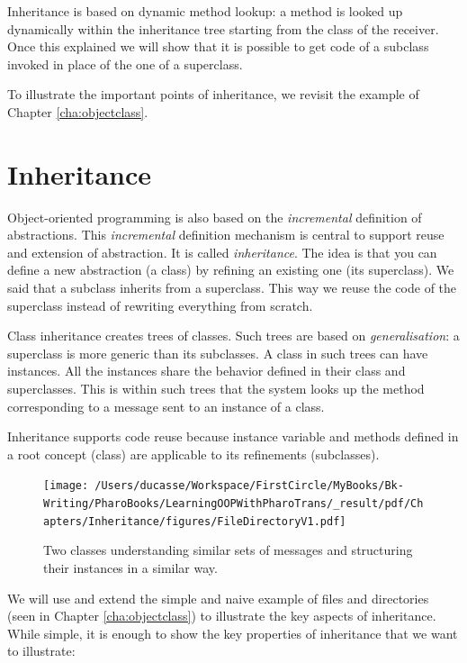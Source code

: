 \documentclass[10pt,twoside,english]{_support/latex/sbabook/sbabook}
\begin{document}
Inheritance is based on dynamic method lookup: a method is looked up dynamically within the inheritance tree starting from the class of the receiver. Once this explained we will show that it is possible to get code of a subclass invoked in place of the one of a superclass. 

To illustrate the important points of inheritance, we revisit the example of Chapter \ref{cha:objectclass}. 
\section{Inheritance}
Object-oriented programming is also based on the \textit{incremental} definition of abstractions. This \textit{incremental} definition mechanism is central to support reuse and extension of abstraction. It is called \textit{inheritance}. The idea is that you can define a new abstraction (a class) by refining an existing one (its superclass). We said that a subclass inherits from a superclass. This way we reuse the code of the superclass instead of rewriting everything from scratch.

Class inheritance creates trees of classes. Such trees are based on \textit{generalisation}: a superclass is more generic than its subclasses. A class in such trees can have instances. All the instances share the behavior defined in their class and superclasses.
This is within such trees that the system looks up the method corresponding to a message sent to an instance of a class.

Inheritance supports code reuse because instance variable and methods defined in a root concept (class) are applicable to its refinements (subclasses).


\begin{figure}

\begin{center}
\texttt{[image: /Users/ducasse/Workspace/FirstCircle/MyBooks/Bk-Writing/PharoBooks/LearningOOPWithPharoTrans/\_result/pdf/Chapters/Inheritance/figures/FileDirectoryV1.pdf]}\caption{Two classes understanding similar sets of messages and structuring their instances in a similar way.\label{FileDirectoryV1}}\end{center}
\end{figure}


We will use and extend the simple and naive example of files and directories (seen in Chapter \ref{cha:objectclass}) to illustrate the key aspects of inheritance. While simple, it is enough to show the key properties of inheritance that we want to illustrate: 
\end{document}
